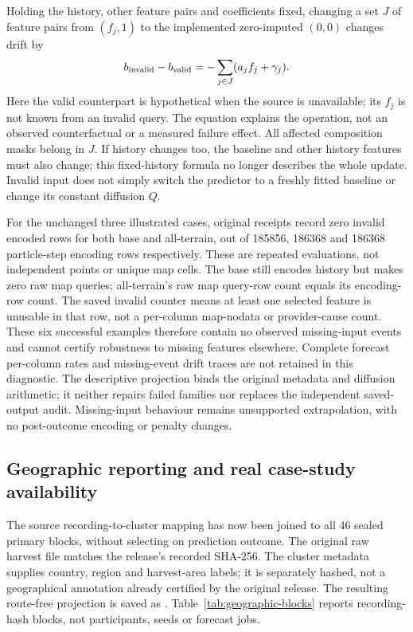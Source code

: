 \documentclass[11pt]{article}
\begin{document}
Holding the history, other feature pairs and coefficients fixed, changing
a set \(J\) of feature pairs from \((f_j,1)\) to the implemented
zero-imputed \((0,0)\) changes drift by
\begin{equation}
 b_{\rm invalid}-b_{\rm valid}
       =-\sum_{j\in J}(a_j f_j+\gamma_j).
 \label{eq:missing-drift-change}
\end{equation}
Here the valid counterpart is hypothetical when the source is unavailable;
its \(f_j\) is not known from an invalid query. The equation explains the
operation, not an observed counterfactual or a measured failure effect.
All affected composition masks belong in \(J\). If history changes too,
the baseline and other history features must also change; this fixed-history
formula no longer describes the whole update. Invalid input does not simply
switch the predictor to a freshly fitted baseline or change its constant
diffusion \(Q\).

For the unchanged three illustrated cases, original receipts record zero
invalid encoded rows for both base and all-terrain, out of 185856,
186368 and 186368 particle-step encoding rows respectively. These are
repeated evaluations, not independent points or unique map cells. The base
still encodes history but makes zero raw map queries; all-terrain's raw map
query-row count equals its encoding-row count. The saved invalid counter
means at least one selected feature is unusable in that row, not a
per-column map-nodata or provider-cause count. These six successful examples
therefore contain no observed missing-input events and cannot certify
robustness to missing features elsewhere. Complete forecast per-column
rates and missing-event drift traces are not retained in this diagnostic.
The descriptive projection
 binds the original
metadata and diffusion arithmetic; it neither repairs failed families nor
replaces the independent saved-output audit. Missing-input behaviour remains
unsupported extrapolation, with no post-outcome encoding or penalty changes.

\subsection{Geographic reporting and real case-study availability}
The source recording-to-cluster mapping has now been joined to all 46 sealed
primary blocks, without selecting on prediction outcome. The original raw
harvest file matches the release's recorded SHA-256. The cluster metadata
supplies country, region and harvest-area labels; it is separately hashed,
not a geographical annotation already certified by the original release.
The resulting route-free projection is saved as
. Table~\ref{tab:geographic-blocks}
reports recording-hash blocks, not participants, seeds or forecast jobs.
\end{document}
